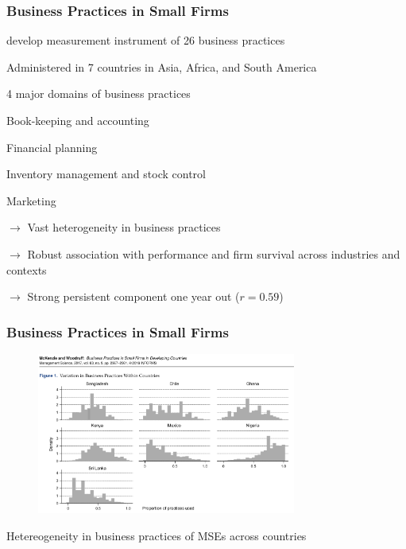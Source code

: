 \documentclass[hideothersubsections, usenames,dvipsnames,11pt]{beamer}
\newenvironment{itemize_2pt}{\itemize\addtolength{\itemsep}{2pt}}{\enditemize}
\newenvironment{enumerate_2pt}{\enumerate\addtolength{\itemsep}{2pt}}{\endenumerate}
\begin{document}

\begin{frame}
\frametitle{Business Practices in Small Firms}

	\citet{McKenzie2017} develop measurement instrument of \textcolor{bdf}{26 business practices} 
	\begin{itemize_2pt}
		\item Administered in \textcolor{bdf}{7 countries} in Asia, Africa, and South America
		
\vspace{0.5em}		
		
		\item 4 major domains of business practices
		\begin{enumerate_2pt}
			\item Book-keeping and accounting
			\item Financial planning
			\item Inventory management and stock control
			\item Marketing
		\end{enumerate_2pt}
	\item[] $\rightarrow$ \textcolor{bdf}{Vast heterogeneity} in business practices \citep[comp.][]{Bloom2010}
	\item[] $\rightarrow$ \textcolor{bdf}{Robust association with performance and firm survival} across industries and contexts
	\item[] $\rightarrow$ \textcolor{bdf}{Strong persistent component} one year out ($r=0.59$)
	\end{itemize_2pt}
\end{frame}


\begin{frame}
\frametitle{Business Practices in Small Firms}

\begin{figure}[htbp]
	\centering
	\includegraphics[width=23em]{pics/McKenzie2017_het.png}
	\label{McKenzie(2017): Hetereogeneity}
\end{figure}

\begin{itemize_2pt}
	\item Hetereogeneity in business practices of MSEs across countries \citep{McKenzie2017}
\end{itemize_2pt}
\end{frame}
\end{document}

